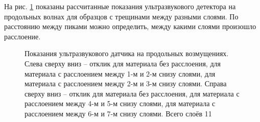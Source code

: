 На рис. \ref{pic:fracture-detection} показаны рассчитанные показания ультразвукового детектора на продольных волнах для образцов с трещинами между разными слоями. По расстоянию между пиками можно определить, между какими слоями произошло расслоение.
\begin{figure}%
	\caption{Показания ультразвукового датчика на продольных возмущениях. Слева сверху вниз -- отклик для материала без расслоения, для материала с расслоением между 1-м и 2-м снизу слоями, для материала с расслоением между 2-м и 3-м снизу слоями. Справа сверху вниз -- отклик для материала без расслоения, для материала с расслоением между 4-м и 5-м снизу слоями, для материала с расслоением между 6-м и 7-м снизу слоями. Всего слоёв 11}
	\label{pic:fracture-detection}
\end{figure}


